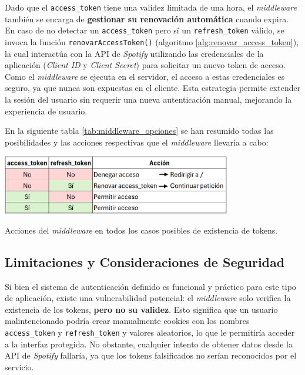 Dado que el \texttt{access\_token} tiene una validez limitada de una hora, el \textit{middleware} también se encarga de \textbf{gestionar su renovación automática} cuando expira. En caso de no detectar un \texttt{access\_token} pero sí un \texttt{refresh\_token} válido, se invoca la función \texttt{renovarAccessToken()} (algoritmo \ref{alg:renovar_access_token}), la cual interactúa con la API de \textit{Spotify} utilizando las credenciales de la aplicación (\textit{Client ID} y \textit{Client Secret}) para solicitar un nuevo token de acceso. Como el \textit{middleware} se ejecuta en el servidor, el acceso a estas credenciales es seguro, ya que nunca son expuestas en el cliente. Esta estrategia permite extender la sesión del usuario sin requerir una nueva autenticación manual, mejorando la experiencia de usuario.

En la siguiente tabla \ref{tab:middleware_opciones} se han resumido todas las posibilidades y las acciones respectivas que el \textit{middleware} llevaría a cabo:

\begin{table}[htbp]
    \centering
    \includegraphics[width=0.75\textwidth]{figures/implementacion/middleware_opciones.png}
    \captionsetup{skip=10pt}
    \caption{Acciones del \textit{middleware} en todos los casos posibles de existencia de tokens.}
    \label{tab:middleware_opciones}
\end{table}

\subsection{Limitaciones y Consideraciones de Seguridad}

Si bien el sistema de autenticación definido es funcional y práctico para este tipo de aplicación, existe una vulnerabilidad potencial: el \textit{middleware} solo verifica la existencia de los tokens, \textbf{pero no su validez}. Esto significa que un usuario malintencionado podría crear manualmente cookies con los nombres \texttt{access\_token} y \texttt{refresh\_token} y valores aleatorios, lo que le permitiría acceder a la interfaz protegida. No obstante, cualquier intento de obtener datos desde la API de \textit{Spotify} fallaría, ya que los tokens falsificados no serían reconocidos por el servicio.

